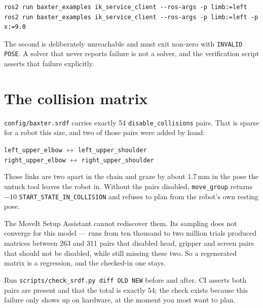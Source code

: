 \begin{lstlisting}
ros2 run baxter_examples ik_service_client --ros-args -p limb:=left
ros2 run baxter_examples ik_service_client --ros-args -p limb:=left -p x:=9.0
\end{lstlisting}

The second is deliberately unreachable and must exit non-zero with
\texttt{INVALID POSE}. A solver that never reports failure is not a solver, and
the verification script asserts that failure explicitly.

\section{The collision matrix}

\texttt{config/baxter.srdf} carries exactly 54 \texttt{disable\_collisions} pairs.
That is sparse for a robot this size, and two of those pairs were added by hand:

\begin{center}
\texttt{left\_upper\_elbow} $\leftrightarrow$ \texttt{left\_upper\_shoulder}\\
\texttt{right\_upper\_elbow} $\leftrightarrow$ \texttt{right\_upper\_shoulder}
\end{center}

Those links are two apart in the chain and graze by about 1.7\,mm in the pose the
untuck tool leaves the robot in. Without the pairs disabled, \texttt{move\_group}
returns $-10$ \texttt{START\_STATE\_IN\_COLLISION} and refuses to plan from the
robot's own resting pose.

The MoveIt Setup Assistant cannot rediscover them. Its sampling does not converge
for this model --- runs from ten thousand to two million trials produced matrices
between 263 and 311 pairs that disabled head, gripper and screen pairs that should
not be disabled, while still missing these two. So a regenerated matrix is a
regression, and the checked-in one stays.

\begin{safetybox}
Run \texttt{scripts/check\_srdf.py diff OLD NEW} before and after. CI asserts
both pairs are present and that the total is exactly 54; the check exists because
this failure only shows up on hardware, at the moment you most want to plan.
\end{safetybox}
